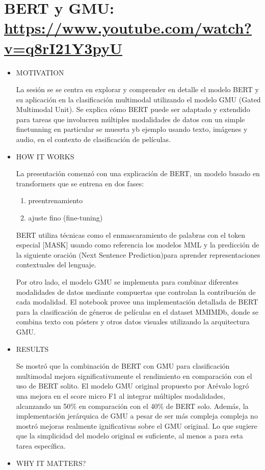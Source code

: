 \documentclass[letter, 11pt, twoside]{report}
\begin{document}
\section*{BERT y GMU: \color{mirosa}\url{https://www.youtube.com/watch?v=q8rI21Y3pyU}}
\begin{itemize}
    \item MOTIVATION
    
    La sesión se se centra en explorar y comprender en detalle el modelo BERT y su aplicación en la clasificación multimodal utilizando el modelo GMU (Gated Multimodal Unit). Se explica cómo BERT puede ser adaptado y extendido para tareas que involucren múltiples modalidades de datos con un simple finetunning en particular se muesrta yb ejemplo usando texto, imágenes y audio, en el contexto de clasificación de películas. 
    \item HOW IT WORKS
    
    La presentación comenzó con una explicación de BERT, un modelo basado en transformers que se entrena en dos fases: 
    \begin{enumerate}
        \item preentrenamiento
        \item ajuste fino (fine-tuning)
    \end{enumerate}
     BERT utiliza técnicas como el enmascaramiento de palabras con el token especial [MASK] usando como referencia los modelos MML y la predicción de la siguiente oración (Next Sentence Prediction)para aprender representaciones contextuales del lenguaje. 
     
     Por otro lado, el modelo GMU se implementa para combinar diferentes modalidades de datos mediante compuertas que controlan la contribución de cada modalidad. El notebook provee una implementación detallada de BERT para la clasificación de géneros de películas en el dataset MMIMDb, donde se combina texto con pósters y otros datos visuales utilizando la arquitectura GMU.

    \item RESULTS
    
    Se mostró que la combinación de BERT con GMU para clasificación multimodal mejora significativamente el rendimiento en comparación con el uso de BERT solito. El modelo GMU original propuesto por Arévalo logró una mejora en el score micro F1 al integrar múltiples modalidades, alcanzando un 50$\%$ en comparación con el 40$\%$ de BERT solo. Además, la implementación jerárquica de GMU a pesar de ser más compleja compleja no mostró mejoras realmente ignificativas sobre el GMU original. Lo que sugiere que la simplicidad del modelo original es suficiente, al menos a para esta tarea específica.
    \item WHY IT MATTERS?
    

\end{itemize}
\end{document}
